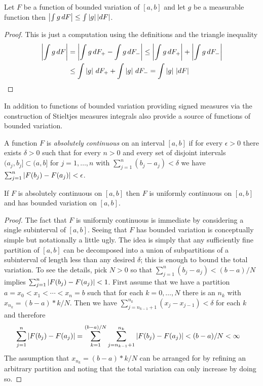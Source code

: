 \begin{lem}\label{AbsoluteValueOfStieltjes}Let $F$ be a function of bounded variation of $[a,b]$ and
  let $g$ be a measurable function then $\left \vert  \int g \, dF \right \vert \leq \int
  \left \vert g \right \vert \left \vert dF \right \vert$.
\end{lem}
\begin{proof}
This is just a computation using the definitions and the triangle inequality
\begin{align*}
\left \vert \int g \, dF \right \vert &= \left \vert \int g \, dF_+ - \int g \, dF_- \right \vert \leq
\left \vert \int g \, dF_+ \right \vert  + \left \vert  \int g \, dF_- \right \vert \\
&\leq\int \left \vert  g \right \vert \,
dF_++ \int \left \vert  g \right \vert \, dF_- = \int \left \vert g \right \vert \, \left \vert dF \right \vert
\end{align*}
\end{proof}

In addition to functions of bounded variation providing signed
measures via the construction of Stieltjes measures integrals also
provide a source of functions of bounded variation.

\begin{defn}A function $F$ is \emph{absolutely continuous} on an
  interval $[a,b]$ if for every $\epsilon > 0$ there exists $\delta>0$
  such that for every $n > 0$ and every set of disjoint intervals $(a_j, b_j] \subset
  (a,b]$ for $j=1, \dotsc, n$ with $\sum_{j=1}^n (b_j-a_j) < \delta$
  we have $\sum_{j=1}^n \left \vert F(b_j)-F(a_j) \right \vert < \epsilon$.
\end{defn}

\begin{lem}\label{AbsoluteContinuityImpliesContinuousBoundedVariation}If $F$ is absolutely continuous on $[a,b]$ then $F$ is
 uniformly continuous on $[a,b]$ and has bounded variation on $[a,b]$.
\end{lem}
\begin{proof}
The fact that $F$ is uniformly continuous is immediate by considering a single
subinterval of $[a,b]$.  Seeing that $F$ has bounded variation is
conceptually simple but notationally a little ugly.  The idea is simply
that any sufficiently fine partition of $[a,b]$ can be decomposed into
a union of subpartitions of a subinterval of length less than any
desired $\delta$; this is enough to bound the total variation. To see
the details, pick
$N > 0$ so that  $\sum_{j=1}^n (b_j-a_j) < (b-a)/N$ implies
$\sum_{j=1}^n \left \vert F(b_j)-F(a_j) \right \vert < 1$.  First assume that we have a
partition $a=x_0 < x_1 < \dotsb < x_n=b$ such that for each $k=0,
\dotsc, N$ there is an $n_k$ with $x_{n_k} = (b-a)*k/N$. Then we
have $\sum_{j=n_{k-1}+1}^{n_k} (x_j - x_{j-1}) < \delta$ for
each $k$ and therefore
\begin{align*}
\sum_{j=1}^n \left \vert F(b_j)-F(a_j) \right \vert &= \sum_{k=1}^{(b-a)/N}\sum_{j=n_{k-1}+1}^{n_k}
\left \vert F(b_j)-F(a_j) \right \vert < (b-a) /N < \infty
\end{align*}
The assumption that $x_{n_k} = (b-a)*k/N$ can be arranged for by refining
an arbitrary partition and noting that the total variation can only increase by
doing so.
\end{proof}

